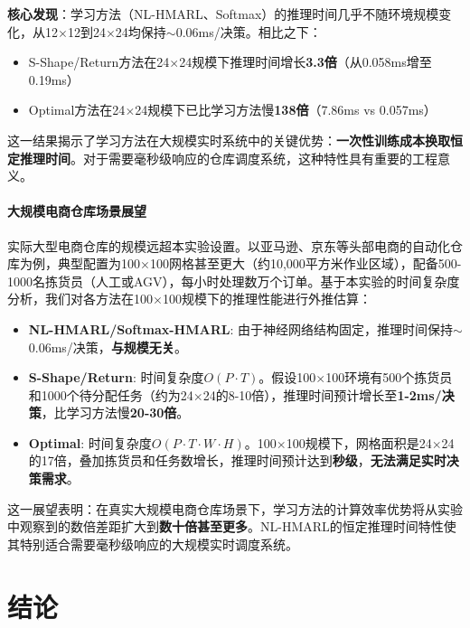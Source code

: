 \documentclass[12pt,a4paper]{article}
\begin{document}
\textbf{核心发现}：学习方法（NL-HMARL、Softmax）的推理时间几乎不随环境规模变化，从12$\times$12到24$\times$24均保持$\sim$0.06ms/决策。相比之下：
\begin{itemize}
\item S-Shape/Return方法在24$\times$24规模下推理时间增长\textbf{3.3倍}（从0.058ms增至0.19ms）
\item Optimal方法在24$\times$24规模下已比学习方法慢\textbf{138倍}（7.86ms vs 0.057ms）
\end{itemize}

这一结果揭示了学习方法在大规模实时系统中的关键优势：\textbf{一次性训练成本换取恒定推理时间}。对于需要毫秒级响应的仓库调度系统，这种特性具有重要的工程意义。

\paragraph{大规模电商仓库场景展望}

实际大型电商仓库的规模远超本实验设置。以亚马逊、京东等头部电商的自动化仓库为例，典型配置为100$\times$100网格甚至更大（约10,000平方米作业区域），配备500-1000名拣货员（人工或AGV），每小时处理数万个订单。基于本实验的时间复杂度分析，我们对各方法在100$\times$100规模下的推理性能进行外推估算：

\begin{itemize}
\item \textbf{NL-HMARL/Softmax-HMARL}: 由于神经网络结构固定，推理时间保持$\sim$0.06ms/决策，\textbf{与规模无关}。

\item \textbf{S-Shape/Return}: 时间复杂度$O(P \cdot T)$。假设100$\times$100环境有500个拣货员和1000个待分配任务（约为24$\times$24的8-10倍），推理时间预计增长至\textbf{1-2ms/决策}，比学习方法慢\textbf{20-30倍}。

\item \textbf{Optimal}: 时间复杂度$O(P \cdot T \cdot W \cdot H)$。100$\times$100规模下，网格面积是24$\times$24的17倍，叠加拣货员和任务数增长，推理时间预计达到\textbf{秒级}，\textbf{无法满足实时决策需求}。
\end{itemize}

这一展望表明：在真实大规模电商仓库场景下，学习方法的计算效率优势将从实验中观察到的数倍差距扩大到\textbf{数十倍甚至更多}。NL-HMARL的恒定推理时间特性使其特别适合需要毫秒级响应的大规模实时调度系统。

\section{结论}
\end{document}
